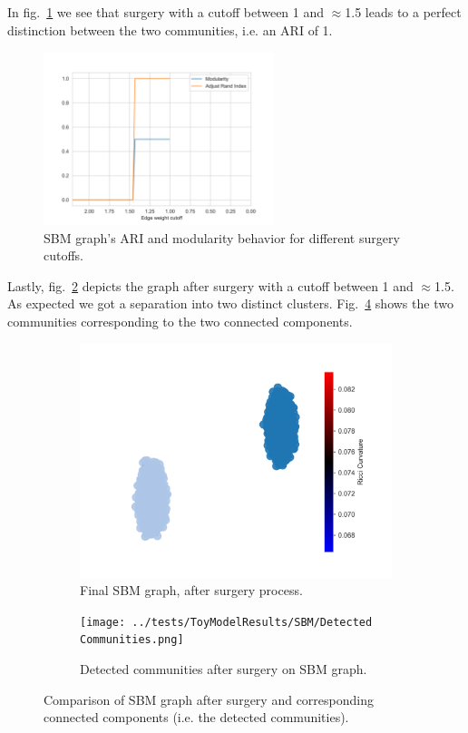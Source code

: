 In fig.~\ref{fig:SBM_Accuracy} we see that surgery with a cutoff between 1 and $\approx$1.5 leads to a perfect distinction between the two communities, i.e. an ARI of 1.

\begin{figure}
    \centering
    \includegraphics[width=0.6\textwidth]{../tests/ToyModelResults/SBM/Surgery Accuracy.png}
    \caption{SBM graph's ARI and modularity behavior for different surgery cutoffs.}
    \label{fig:SBM_Accuracy}
\end{figure}

Lastly, fig.~\ref{fig:SBM_Communities_a} depicts the graph after surgery with a cutoff between 1 and $\approx$1.5. As expected we got a separation into two distinct clusters. Fig.~\ref{fig:SBM_Communities_b} shows the two communities corresponding to the two connected components.
\begin{figure}
    \centering
    \begin{subfigure}{0.45\textwidth}
        \centering
        \includegraphics[width=\textwidth]{../tests/ToyModelResults/SBM/After Surgery.png}
        \caption{Final SBM graph, after surgery process.}
        \label{fig:SBM_Communities_a}
    \end{subfigure}
    \hfill
    \begin{subfigure}{0.45\textwidth}
        \centering
        \texttt{[image: ../tests/ToyModelResults/SBM/Detected Communities.png]}
        \caption{Detected communities after surgery on SBM graph.}
        \label{fig:SBM_Communities_b}
    \end{subfigure}
    \caption{Comparison of SBM graph after surgery and corresponding connected components (i.e. the detected communities).}
\end{figure}


